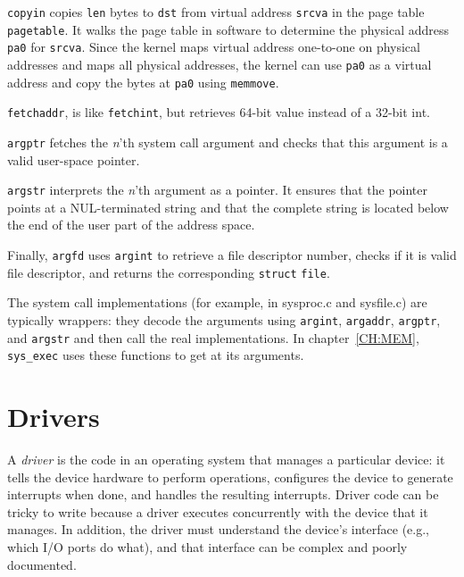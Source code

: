 \lstinline{copyin}
 copies \lstinline{len} bytes to
\lstinline{dst} from virtual address \lstinline{srcva} in the page
table \lstinline{pagetable}.  It walks the page table in software to
determine the physical address \lstinline{pa0} for \lstinline{srcva}.
Since the kernel maps virtual address one-to-one on physical
addresses and maps all physical addresses, the kernel can use
\lstinline{pa0} as a virtual address and copy the bytes at
\lstinline{pa0} using \lstinline{memmove}.

\lstinline{fetchaddr},
is like
\lstinline{fetchint},
but retrieves 64-bit value instead of a 32-bit int.

\lstinline{argptr}
fetches the
\textit{n}'th 
system call argument and checks that this argument is a valid
user-space pointer.

\lstinline{argstr} 
interprets the
\textit{n}'th 
argument as a pointer.  It ensures that the pointer points at a
NUL-terminated string and that the complete string is located below
the end of the user part of the address space.

Finally,
\lstinline{argfd}
uses
\lstinline{argint}
to retrieve a file descriptor number, checks if it is valid
file descriptor, and returns the corresponding
\lstinline{struct}
\lstinline{file}.

The system call implementations (for example, in sysproc.c and sysfile.c)
are typically wrappers: they decode the arguments using 
\lstinline{argint},
\lstinline{argaddr},
\lstinline{argptr}, 
and 
\lstinline{argstr}
and then call the real implementations.
In chapter~\ref{CH:MEM},
\lstinline{sys_exec}
uses these functions to get at its arguments.

\section{Drivers}

A
\textit{driver}
is the code in an operating system that manages a particular device:
it tells the device hardware to perform operations,
configures the device to generate interrupts when done,
and handles the resulting interrupts.
Driver code can be tricky to write
because a driver executes concurrently with the device that it manages.  In
addition, the driver must understand the device's interface (e.g., which I/O
ports do what), and that interface can be complex and poorly documented.

